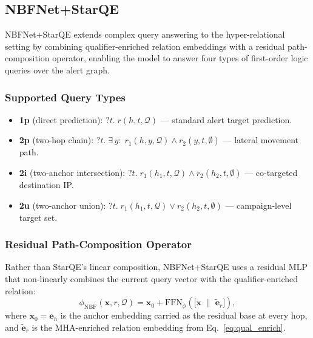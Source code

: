 \documentclass[10pt,journal,compsoc]{IEEEtran}
\begin{document}
\subsection{NBFNet+StarQE}
\label{ssec:nbfstarqe}

NBFNet+StarQE extends complex query answering to the
hyper-relational setting by combining qualifier-enriched
relation embeddings with a residual path-composition
operator, enabling the model to answer four types of
first-order logic queries over the alert graph.

\subsubsection{Supported Query Types}
\begin{itemize}
  \item \textbf{1p} (direct prediction):
    $?t.\; r(h, t, \mathcal{Q})$
    — standard alert target prediction.
  \item \textbf{2p} (two-hop chain):
    $?t.\; \exists\,y:\; r_1(h, y, \mathcal{Q})
    \wedge r_2(y, t, \emptyset)$
    — lateral movement path.
  \item \textbf{2i} (two-anchor intersection):
    $?t.\; r_1(h_1, t, \mathcal{Q})
    \wedge r_2(h_2, t, \emptyset)$
    — co-targeted destination IP.
  \item \textbf{2u} (two-anchor union):
    $?t.\; r_1(h_1, t, \mathcal{Q})
    \vee r_2(h_2, t, \emptyset)$
    — campaign-level target set.
\end{itemize}

\subsubsection{Residual Path-Composition Operator}
Rather than StarQE's linear composition, NBFNet+StarQE
uses a residual MLP that non-linearly combines the current
query vector with the qualifier-enriched relation:
\begin{equation}
  \phi_{\mathrm{NBF}}(\mathbf{x}, r, \mathcal{Q})
  = \mathbf{x}_0
    + \mathrm{FFN}_\phi\!\left(
        \bigl[\mathbf{x}
        \;\|\; \tilde{\mathbf{e}}_r\bigr]
      \right),
  \label{eq:nbfqe_compose}
\end{equation}
where $\mathbf{x}_0 = \mathbf{e}_h$ is the anchor embedding
carried as the residual base at every hop, and
$\tilde{\mathbf{e}}_r$ is the MHA-enriched relation embedding
from Eq.~\eqref{eq:qual_enrich}.
\end{document}
